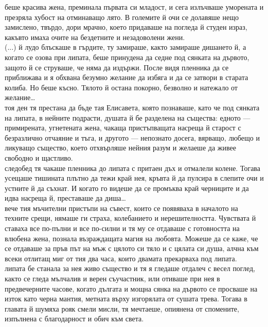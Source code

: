 \documentclass[12pt,a4paper]{article}
\begin{document}
 беше красива жена, преминала първата си младост, и сега излъчваше уморената и презряла хубост на отминаващо лято. В големите й очи се долавяше нещо замислено, твърдо, дори мрачно, което придаваше на погледа й студен израз, какъвто имаха очите на бездетните и незадоволени жени.\\
(...)
 й лудо блъскаше в гърдите, ту замираше, както замираше дишането й, а когато се озова при липата, беше принудена да седне под сянката на дървото, защото й се струваше, че няма да издържи. После видя пленника да се приближава и я обхвана безумно желание да избяга и да се затвори в старата колиба. Но беше късно. Тялото й остана покорно, безволно и натежало от желание…\\
 тоя ден тя престана да бъде тая Елисавета, която познаваше, като че под сянката на липата, в нейните подрасти, душата й бе разделена на същества: едното — примирената, угнетената жена, чакаща пристъпващата насреща й старост с безразлично отчаяние и тъга, и другото — непознато досега, вярващо, любещо и ликуващо същество, което отхвърляше нейния разум и желаеше да живее свободно и щастливо.\\
 следобед тя чакаше пленника до липата с притаен дъх и отмалели колене. Тогава усещаше тишината плътно да тежи край нея, кръвта й да пулсира в слепите очи и устните й да съхнат. И когато го видеше да се промъква край черниците и да идва насреща й, преставаше да диша…\\
 вече тия мъчителни пристъпи на съвест, които се появяваха в началото на техните срещи, нямаше ги страха, колебанието и нерешителността. Чувствата й ставаха все по-пълни и все по-силни и тя му се отдаваше с готовността на влюбена жена, познала възраждащата магия на любовта. Можеше да се каже, че се отдаваше за пръв път на мъж с цялото си тяло и с цялата си душа, алчна към всеки отлитащ миг от тия два часа, които двамата прекарваха под липата.\\
 липата бе станала за нея живо същество и тя я гледаше отдалеч с весел поглед, както се гледа мълчалив и верен съучастник, или отиваше при нея в предвечерните часове, когато дългата и мощна сянка на дървото се просваше на изток като черна мантия, метната върху изгорялата от сушата трева. Тогава в главата й шумяха рояк смели мисли, тя мечтаеше, опиянена от спомените, изпълнена с благодарност и обич към света.
\end{document}
